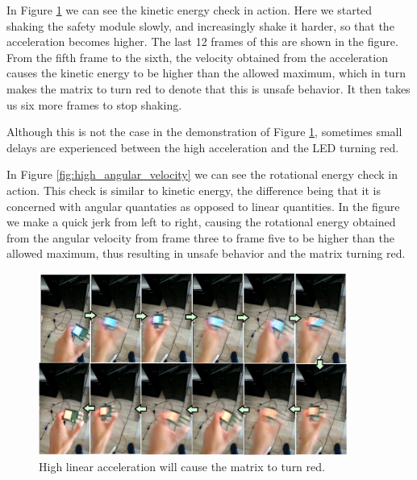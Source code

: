 \documentclass[12pt]{scrreprt}
\begin{document}
\par
In Figure \ref{fig:high_linear_acceleration} we can see the kinetic energy check in action. Here we started shaking the safety module slowly, and increasingly shake it harder, so that the acceleration becomes higher. The last 12 frames of this are shown in the figure. From the fifth frame to the sixth, the velocity obtained from the acceleration causes the kinetic energy to be higher than the allowed maximum, which in turn makes the matrix to turn red to denote that this is unsafe behavior. It then takes us six more frames to stop shaking.
\par
Although this is not the case in the demonstration of Figure \ref{fig:high_linear_acceleration}, sometimes small delays are experienced between the high acceleration and the LED turning red.
\par
In Figure \ref{fig:high_angular_velocity} we can see the rotational energy check in action. This check is similar to kinetic energy, the difference being that it is concerned with angular quantaties as opposed to linear quantities. In the figure we make a quick jerk from left to right, causing the rotational energy obtained from the angular velocity from frame three to frame five to be higher than the allowed maximum, thus resulting in unsafe behavior and the matrix turning red.

\begin{figure}[H]
    \centering
    \includegraphics[width=0.9\textwidth]{Figures/results/lighting_leds/linear_acceleration.png}
    \caption{High linear acceleration will cause the matrix to turn red.}
    \label{fig:high_linear_acceleration}
\end{figure}
\end{document}
